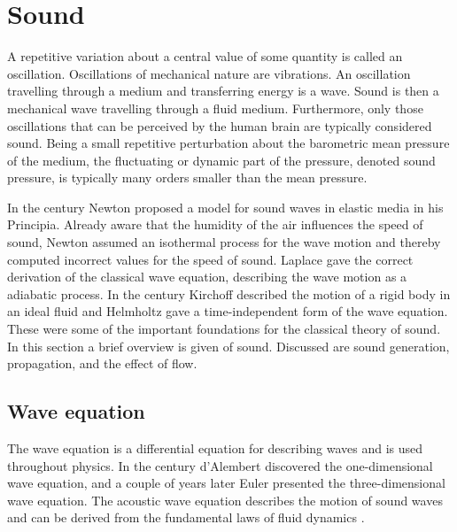 \section{Sound}

A repetitive variation about a central value of some quantity is called an
oscillation. Oscillations of mechanical nature are vibrations. An
oscillation travelling through a medium and transferring energy is a wave. Sound
is then a mechanical wave travelling through a fluid medium. Furthermore, only
those oscillations that can be perceived by the human brain are typically
considered sound.
Being a small repetitive perturbation about the barometric
mean pressure of the medium, the fluctuating or dynamic part of the pressure,
denoted sound pressure, is typically many orders smaller than the mean
pressure.

In the  century Newton proposed a model for sound waves in elastic media
in his Principia. Already aware that the humidity of the air influences the
speed of sound, Newton assumed an isothermal process for the wave motion and
thereby computed incorrect values for the speed of sound. Laplace gave the
correct derivation of the classical wave equation, describing the wave motion as
a adiabatic process. In the  century Kirchoff described the motion of a
rigid body in an ideal fluid and Helmholtz gave a time-independent form of the
wave equation. These were some of the important foundations for the classical
theory of sound.
In this section a brief overview is given of sound. Discussed are sound
generation, propagation, and the effect of flow.

\subsection{Wave equation}\label{sec:theory:sound:wave}
The wave equation is a differential equation for describing waves and is used
throughout physics. In the  century d'Alembert discovered the
one-dimensional wave equation, and a couple of years later Euler presented the
three-dimensional wave equation. The acoustic wave equation describes the motion
of sound waves and can be derived from the fundamental laws of fluid dynamics \cite{Arntzen2014a, Rienstra2017}.

